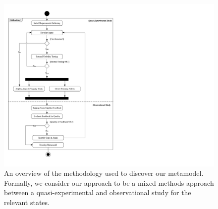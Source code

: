 \begin{figure}[p]
  \centering
  \includegraphics[width=\textwidth]{images/dataset/methodology}
  \caption[Implementation methodology]{An overview of the methodology used to discover our metamodel. Formally, we consider our approach to be a mixed methods approach between a quasi-experimental and observational study for the relevant states.}
  \label{fig:dataset:methodology}
\end{figure}
